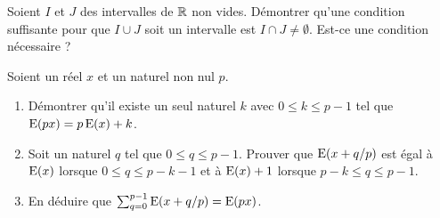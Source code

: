 \begin{exercice}
  Soient \(I\) et \(J\) des intervalles de \(\mathbb{R}\) non vides. Démontrer qu'une 
  condition suffisante pour que \(I \cup J\) soit un intervalle est \(I \cap J 
  \neq \emptyset\). Est-ce une condition nécessaire ?
\end{exercice}
\begin{exercice}
  Soient un réel \(x\) et un naturel non nul \(p\).
  \begin{enumerate}
    \item Démontrer qu'il existe un seul naturel \(k\) avec \(0 \leqslant k 
      \leqslant p-1\) tel que \(\operatorname{E}(px) = p\operatorname{E}(x)+k\).
    \item Soit un naturel \(q\) tel que \(0 \leqslant q \leqslant p-1\). Prouver 
      que \(\operatorname{E}(x+q/p)\) est égal à \(\operatorname{E}(x)\) lorsque \(0 \leqslant q 
      \leqslant p-k-1\) et à \(\operatorname{E}(x)+1\) lorsque \(p-k\leqslant q \leqslant 
      p-1\).
    \item En déduire que \(\sum_{q=0}^{p-1} \operatorname{E}(x+q/p) = \operatorname{E}(px)\).
  \end{enumerate}
\end{exercice}

